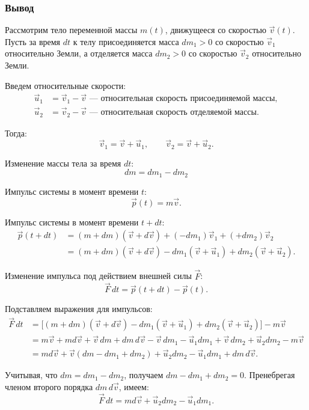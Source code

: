 \subsubsection{Вывод}

Рассмотрим тело переменной массы $m(t)$, движущееся со скоростью $\vec{v}(t)$. Пусть за время $dt$ к телу присоединяется масса $dm_1 > 0$ со скоростью $\vec{v}_1$ относительно Земли, а отделяется масса $dm_2 > 0$ со скоростью $\vec{v}_2$ относительно Земли.

Введем относительные скорости:
\begin{align*}
\vec{u}_1 &= \vec{v}_1 - \vec{v} \text{ --- относительная скорость присоединяемой массы}, \\
\vec{u}_2 &= \vec{v}_2 - \vec{v} \text{ --- относительная скорость отделяемой массы}.
\end{align*}

Тогда:
\[
\vec{v}_1 = \vec{v} + \vec{u}_1, \qquad \vec{v}_2 = \vec{v} + \vec{u}_2.
\]

Изменение массы тела за время $dt$:
\[
dm = dm_1 - dm_2
\]

Импульс системы в момент времени $t$:
\[
\vec{p}(t) = m\vec{v}.
\]

Импульс системы в момент времени $t+dt$:
\begin{align*}
\vec{p}(t+dt) &= (m + dm)(\vec{v} + d\vec{v}) + (-dm_1)\vec{v}_1 + (+dm_2)\vec{v}_2 \\
&= (m + dm)(\vec{v} + d\vec{v}) - dm_1(\vec{v} + \vec{u}_1) + dm_2(\vec{v} + \vec{u}_2).
\end{align*}

Изменение импульса под действием внешней силы $\vec{F}$:
\[
\vec{F}\, dt = \vec{p}(t+dt) - \vec{p}(t).
\]

Подставляем выражения для импульсов:
\begin{align*}
\vec{F}\, dt &= \big[(m + dm)(\vec{v} + d\vec{v}) - dm_1(\vec{v} + \vec{u}_1) + dm_2(\vec{v} + \vec{u}_2)\big] - m\vec{v} \\
&= m\vec{v} + m d\vec{v} + \vec{v}\, dm + dm\, d\vec{v} - \vec{v}\, dm_1 - \vec{u}_1 dm_1 + \vec{v}\, dm_2 + \vec{u}_2 dm_2 - m\vec{v} \\
&= m d\vec{v} + \vec{v}(dm - dm_1 + dm_2) + \vec{u}_2 dm_2 - \vec{u}_1 dm_1 + dm\, d\vec{v}.
\end{align*}

Учитывая, что $dm = dm_1 - dm_2$, получаем $dm - dm_1 + dm_2 = 0$. Пренебрегая членом второго порядка $dm\, d\vec{v}$, имеем:
\[
\vec{F}\, dt = m d\vec{v} + \vec{u}_2 dm_2 - \vec{u}_1 dm_1.
\]

